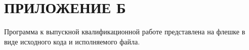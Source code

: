 \chapter*{ПРИЛОЖЕНИЕ Б}
Программа к выпускной квалификационной работе представлена на флешке в виде исходного кода и исполняемого файла.